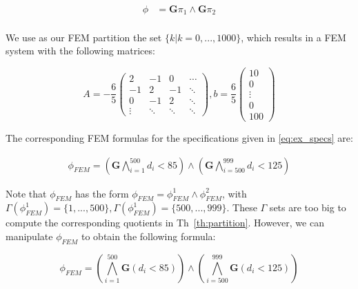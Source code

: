 \documentclass{article}
\newcommand{\Always}{\mathbf{G}}
\begin{document}
\begin{equation}
\label{eq:ex_specs}
    \begin{aligned}
        \phi &= \Always \pi_1 \wedge \Always \pi_2 \\ 
    \end{aligned}
\end{equation}

We use as our FEM partition the set $\{k | k = 0,...,1000\}$, which results
in a FEM system with the following matrices:

\begin{equation}
    A = - \frac{6} {5} \begin{pmatrix}
        2 & -1  & 0 & \cdots \\ 
        -1 & 2 & -1 & \ddots \\ 
        0 & -1 & 2 & \ddots \\
        \vdots & \ddots & \ddots & \ddots 
    \end{pmatrix},
    b = \frac{6} {5}\begin{pmatrix}
        10 \\
        0 \\
        \vdots \\
        0 \\
        100
    \end{pmatrix}
\end{equation}

The corresponding FEM formulas for the specifications given in
\eqref{eq:ex_specs} are:

\begin{equation}
    \begin{aligned}
        \phi_{FEM} = (\Always \bigwedge_{i = 1}^{500} d_i < 85) \wedge (\Always
            \bigwedge_{i = 500}^{999} d_i < 125)
    \end{aligned}
\end{equation}

Note that $\phi_{FEM}$ has the form $\phi_{FEM} = \phi^1_{FEM} \wedge
\phi^2_{FEM}$, with $\Gamma(\phi^1_{FEM}) = \{1,...,500\}, \Gamma(\phi^1_{FEM})
= \{500,...,999\}$. These $\Gamma$ sets are too big to compute the corresponding
quotients in Th~\ref{th:partition}. However, we can manipulate $\phi_{FEM}$ to obtain the
following formula:

\begin{equation}
    \phi_{FEM} = (\bigwedge_{i = 1}^{500} \Always (d_i < 85)) \wedge
    (\bigwedge_{i = 500}^{999} \Always (d_i < 125))
\end{equation}
\end{document}
